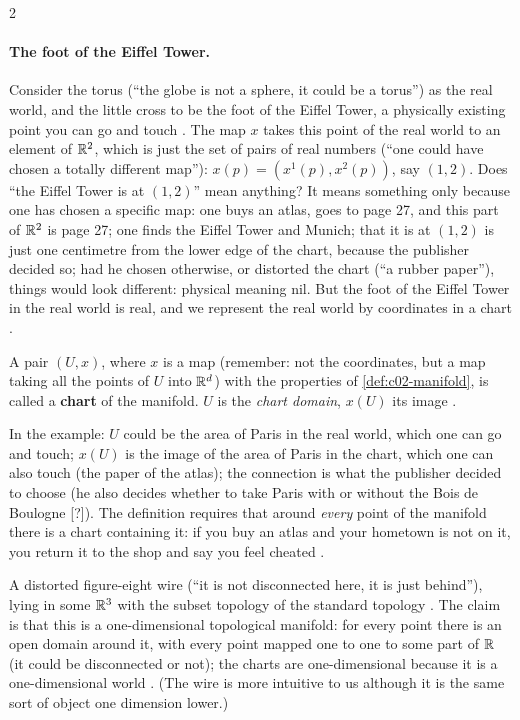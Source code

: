 \begin{paracol}{2}
\paragraph{The foot of the Eiffel Tower.} Consider the torus (``the globe is not a sphere, it could be a torus'') as the real world, and the little cross to be the foot of the Eiffel Tower, a
physically existing point you can go and touch . The map $x$ takes this point of the real world to an element of $\mathbb{R}^2$, which is just the set of pairs of real
numbers (``one could have chosen a totally different map''): $x(p)=(x^1(p),x^2(p))$, say $(1,2)$. Does ``the Eiffel Tower is at $(1,2)$'' mean anything? It means something only because
one has chosen a specific map: one buys an atlas, goes to page 27, and this part of $\mathbb{R}^2$ is page 27; one finds the Eiffel Tower and Munich; that it is at $(1,2)$ is just one centimetre
from the lower edge of the chart, because the publisher decided so; had he chosen otherwise, or distorted the chart (``a rubber paper''), things would look different: physical meaning nil.
But the foot of the Eiffel Tower in the real world is real, and we represent the real world by coordinates in a chart .

\begin{definition}\label{def:c02-chart}
A pair $(U,x)$, where $x$ is a map (remember: not the coordinates, but a map taking all the points of $U$ into $\mathbb{R}^d$) with the properties of \cref{def:c02-manifold}, is called a
\textbf{chart} of the manifold. $U$ is the \emph{chart domain}, $x(U)$ its image .
\end{definition}
In the example: $U$ could be the area of Paris in the real world, which one can go and touch; $x(U)$ is the image of the area of Paris in the chart, which one can also touch
(the paper of the atlas); the connection is what the publisher decided to choose (he also decides whether to take Paris with or without the Bois de Boulogne [?]). The definition requires
that around \emph{every} point of the manifold there is a chart containing it: if you buy an atlas and your hometown is not on it, you return it to the shop and say you feel cheated
.

\begin{example}\label{ex:c02-wire}
A distorted figure-eight wire (``it is not disconnected here, it is just behind''), lying in some $\mathbb{R}^3$ with the subset topology of the standard topology .
The claim is that this is a one-dimensional topological manifold: for every point there is an open domain around it, with every point mapped one to one to some part of $\mathbb{R}$ (it could be
disconnected or not); the charts are one-dimensional because it is a one-dimensional world . (The wire is more intuitive to us although it is the same
sort of object one dimension lower.)
\end{example}


\end{paracol}

